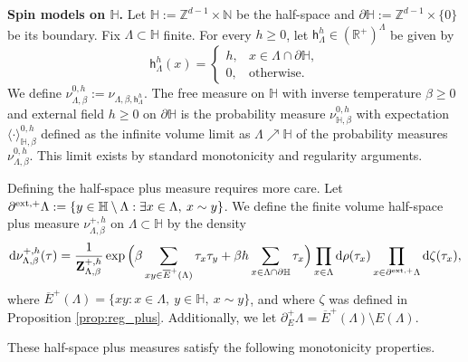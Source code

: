 \documentclass[11pt,a4paper]{article}
\numberwithin{equation}{section}
\theoremstyle{plain}
\theoremstyle{definition}
\begin{document}
\noindent\textbf{Spin models on $\mathbb H$.} Let $\mathbb H:= \mathbb Z^{d-1}\times \mathbb N$ be the half-space and $\partial \mathbb H:= \mathbb Z^{d-1}\times \{0\}$ be its boundary. Fix $\Lambda\subset \mathbb H$ finite. For every $h \geq 0$, let $\mathsf h_{\Lambda}^h \in (\mathbb R^+)^{\Lambda}$ be given by
\begin{equation}\label{eq:def mag field on halfspace}
\mathsf h_{\Lambda}^h(x)= \begin{cases} h, & x \in \Lambda\cap \partial \mathbb H, \\ 0, & \text{otherwise.} \end{cases}
\end{equation}
We define $\nu^{0,h}_{\Lambda,\beta}:= \nu_{\Lambda, \beta, \mathsf h^h_\Lambda}$. The free measure on $\mathbb H$ with inverse temperature $\beta \geq 0$ and external field $h\geq 0$ on $\partial \mathbb H$ is the probability measure $\nu^{0,h}_{\mathbb H,\beta}$ with expectation  $\langle \cdot \rangle^{0,h}_{\mathbb H,\beta}$ defined as the infinite volume limit as $\Lambda\nearrow \mathbb H$ of the probability measures $\nu^{0,h}_{\Lambda, \beta}$. This limit exists by standard monotonicity and regularity arguments. 

Defining the half-space plus measure requires more care. Let $\partial^{\textup{ext},+}\Lambda:=\{y\in \mathbb H\setminus \Lambda: \exists x\in \Lambda, \: x\sim y\}$. We define the finite volume half-space plus measure $\nu^{+,h}_{\Lambda, \beta}$ on $\Lambda \subset \mathbb H$ by the density
\begin{equation}
\mathrm{d}\nu^{+,h}_{\Lambda, \beta}(\tau) = \frac{1}{\mathbf{Z}^{+,h}_{\Lambda,\beta}}\exp\Big(\beta \sum_{xy\in \overline{E}^+(\Lambda)} \tau_x \tau_y +  \beta h \sum_{x \in \Lambda \cap \partial \mathbb H} \tau_x
\Big) \prod_{x \in \Lambda}\mathrm d \rho(\tau_x) \prod_{x \in \partial^{\textup{ext},+}\Lambda}  \mathrm d\zeta(\tau_x),
\end{equation}
where $\overline{E}^+(\Lambda) =  \{xy: x\in \Lambda , \: y\in \mathbb H, \: x\sim y\}$, and where $\zeta$ was defined in Proposition \ref{prop:reg_plus}. Additionally, we let $\partial_E^+\Lambda=\overline{E}^+(\Lambda)\setminus E(\Lambda)$.

These half-space plus measures satisfy the following monotonicity properties.
\end{document}
